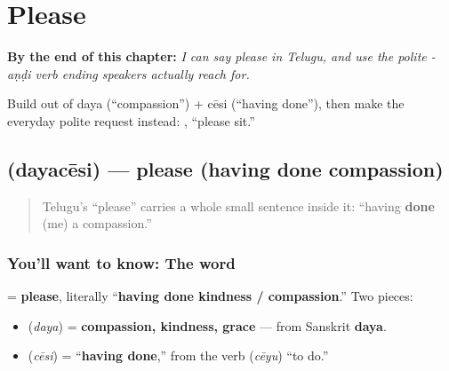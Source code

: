 
\chapter{Please}
\label{ch:te-please}

\begin{chapteropening}
\textbf{By the end of this chapter:} \emph{I can say please in Telugu, and use the polite -aṇḍi verb ending speakers actually reach for.}

Build  out of daya (\textquotedblleft{}compassion\textquotedblright{}) + cēsi (\textquotedblleft{}having done\textquotedblright{}), then make the everyday polite request instead: , \textquotedblleft{}please sit.\textquotedblright{}
\end{chapteropening}

\section[\texorpdfstring{\te{దయచేసి} (dayacēsi)}{దయచేసి (dayacēsi)}]{ (dayacēsi) — please (having done compassion)}

\label{lesson:TE-C08-dayachesi}



\begin{quote}
Telugu's \textquotedblleft{}please\textquotedblright{} carries a whole small sentence inside it: \textquotedblleft{}having \textbf{done} (me) a compassion.\textquotedblright{}
\end{quote}

\subsection*{You'll want to know: The word}
\textbf{} = \textbf{please}, literally \textquotedblleft{}\textbf{having done kindness / compassion}.\textquotedblright{} Two pieces:

\begin{itemize}
\raggedright
  \item \textbf{} (\emph{daya}) = \textbf{compassion, kindness, grace} — from Sanskrit \textbf{daya}.
  \item \textbf{} (\emph{cēsi}) = \textquotedblleft{}\textbf{having done},\textquotedblright{} from the verb \textbf{} (\emph{cēyu}) \textquotedblleft{}to do.\textquotedblright{}
\end{itemize}

